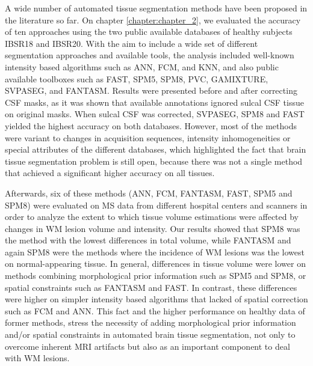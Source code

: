 A wide number of automated tissue segmentation methods have been proposed in the literature so far. On chapter \ref{chapter:chapter_2}, we evaluated the accuracy of ten approaches using the two public available databases of healthy subjects IBSR18 and IBSR20. With the aim to include a wide set of different segmentation approaches and available tools, the analysis included well-known intensity based algorithms such as ANN, FCM, and KNN, and also public available toolboxes such as FAST, SPM5, SPM8, PVC, GAMIXTURE, SVPASEG, and FANTASM. Results were presented before and after correcting CSF masks, as it was shown that available annotations ignored sulcal CSF tissue on original masks. When sulcal CSF was corrected, SVPASEG, SPM8 and FAST yielded the highest accuracy on both databases.  However, most of the methods were variant to changes in acquisition sequences, intensity inhomogeneities or special attributes of the different databases,  which highlighted the fact that brain tissue segmentation problem is still open, because there was not a single method that achieved a significant higher accuracy on all tissues. 

Afterwards, six of these methods (ANN, FCM, FANTASM, FAST, SPM5 and SPM8) were evaluated on MS data from different hospital centers and scanners in order to analyze the extent to which tissue volume estimations were affected by changes in WM lesion volume and intensity. Our results showed that SPM8 was the method with the lowest differences in total volume, while FANTASM and again SPM8 were the methods where the incidence of WM lesions was the lowest on normal-appearing tissue. In general, differences in tissue volume were lower on methods combining morphological prior information such as SPM5 and SPM8, or spatial constraints such as FANTASM and FAST. In contrast, these differences were higher on simpler intensity based algorithms that lacked of spatial correction such as FCM and ANN. This fact and the higher performance on healthy data of former methods, stress the necessity of adding morphological prior information and/or spatial constraints in automated brain tissue segmentation, not only to overcome inherent MRI artifacts but also as an important component to deal with WM lesions.

